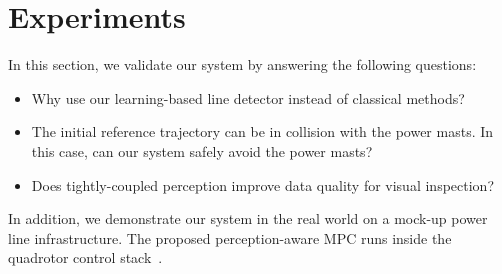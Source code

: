 \section{Experiments}\label{sec:Experiments}
In this section, we validate our system by answering the following questions:

\begin{itemize}
    \item Why use our learning-based line detector instead of classical methods?
    \item The initial reference trajectory can be in collision with the power masts. In this case, can our system safely avoid the power masts?
    \item Does tightly-coupled perception  improve data quality for visual inspection?
\end{itemize}
In addition, we demonstrate our system in the real world on a mock-up power line infrastructure. The proposed perception-aware MPC runs inside the quadrotor control stack~\cite{foehn2022agilicious}.
\medskip


